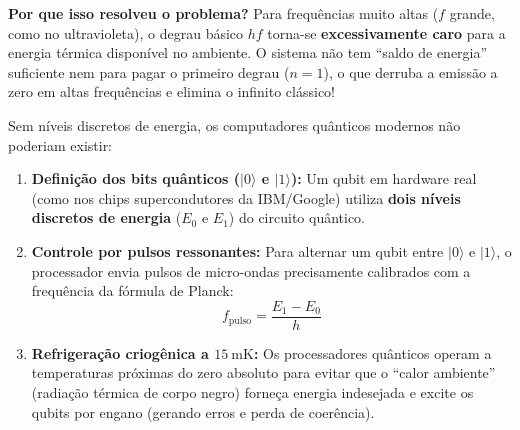 \documentclass[
  brazilian,
]{report}
\providecommand{\tightlist}{%
  \setlength{\itemsep}{0pt}\setlength{\parskip}{0pt}}
\begin{document}
\textbf{Por que isso resolveu o problema?} Para frequências muito altas
(\(f\) grande, como no ultravioleta), o degrau básico \(hf\) torna-se
\textbf{excessivamente caro} para a energia térmica disponível no
ambiente. O sistema não tem ``saldo de energia'' suficiente nem para
pagar o primeiro degrau (\(n=1\)), o que derruba a emissão a zero em
altas frequências e elimina o infinito clássico!

\begin{tcolorbox}[enhanced jigsaw, arc=.35mm, bottomrule=.15mm, bottomtitle=1mm, breakable, colback=white, colbacktitle=quarto-callout-important-color!10!white, colframe=quarto-callout-important-color-frame, coltitle=black, left=2mm, leftrule=.75mm, opacityback=0, opacitybacktitle=0.6, rightrule=.15mm, title=\textcolor{quarto-callout-important-color}{\faExclamation}\hspace{0.5em}{⚛️ O que a radiação do corpo negro tem a ver com a Computação Quântica?}, titlerule=0mm, toprule=.15mm, toptitle=1mm]

Sem níveis discretos de energia, os computadores quânticos modernos não
poderiam existir:

\begin{enumerate}
\def\labelenumi{\arabic{enumi}.}
\tightlist
\item
  \textbf{Definição dos bits quânticos (\(|0\rangle\) e \(|1\rangle\)):}
  Um qubit em hardware real (como nos chips supercondutores da
  IBM/Google) utiliza \textbf{dois níveis discretos de energia} (\(E_0\)
  e \(E_1\)) do circuito quântico.
\item
  \textbf{Controle por pulsos ressonantes:} Para alternar um qubit entre
  \(|0\rangle\) e \(|1\rangle\), o processador envia pulsos de
  micro-ondas precisamente calibrados com a frequência da fórmula de
  Planck: \[f_{\text{pulso}} = \frac{E_1 - E_0}{h}\]
\item
  \textbf{Refrigeração criogênica a \(15\ \text{mK}\):} Os processadores
  quânticos operam a temperaturas próximas do zero absoluto para evitar
  que o ``calor ambiente'' (radiação térmica de corpo negro) forneça
  energia indesejada e excite os qubits por engano (gerando erros e
  perda de coerência).
\end{enumerate}

\end{tcolorbox}
\end{document}
